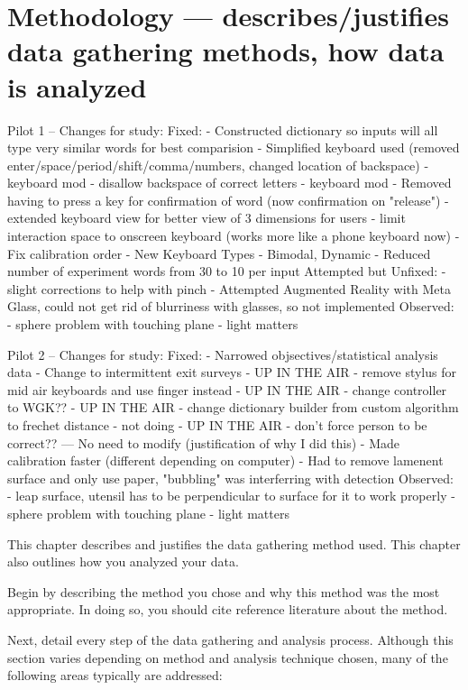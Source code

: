 \chapter{Methodology --- describes/justifies data gathering methods, how data is analyzed}

Pilot 1 -- Changes for study:
Fixed:
- Constructed dictionary so inputs will all type very similar words for best comparision
- Simplified keyboard used (removed enter/space/period/shift/comma/numbers, changed location of backspace)
- keyboard mod - disallow backspace of correct letters
- keyboard mod - Removed having to press a key for confirmation of word (now confirmation on "release")
- extended keyboard view for better view of 3 dimensions for users
- limit interaction space to onscreen keyboard (works more like a phone keyboard now)
- Fix calibration order
- New Keyboard Types - Bimodal, Dynamic
- Reduced number of experiment words from 30 to 10 per input
Attempted but Unfixed:
- slight corrections to help with pinch
- Attempted Augmented Reality with Meta Glass, could not get rid of blurriness with glasses, so not implemented
Observed:
- sphere problem with touching plane
- light matters

Pilot 2 -- Changes for study:
Fixed:
- Narrowed objsectives/statistical analysis data
- Change to intermittent exit surveys
- UP IN THE AIR - remove stylus for mid air keyboards and use finger instead
- UP IN THE AIR - change controller to WGK??
- UP IN THE AIR - change dictionary builder from custom algorithm to frechet distance
- not doing - UP IN THE AIR - don't force person to be correct?? --- No need to modify (justification of why I did this)
- Made calibration faster (different depending on computer)
- Had to remove lamenent surface and only use paper, "bubbling" was interferring with detection
Observed:
- leap surface, utensil has to be perpendicular to surface for it to work properly
- sphere problem with touching plane
- light matters

 This chapter describes and justifies the data gathering method used. This chapter also outlines how you
analyzed your data.

 Begin by describing the method you chose and why this method was the most appropriate. In doing so, you
should cite reference literature about the method.

 Next, detail every step of the data gathering and analysis process. Although this section varies depending
on method and analysis technique chosen, many of the following areas typically are addressed:


